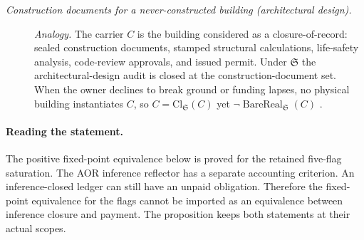 \begingroup\small
\begin{description}
\item[\emph{Construction documents for a
never-constructed building (architectural
design).}] \textit{Analogy.}
The carrier \(C\) is the building considered as a
closure-of-record: sealed construction documents,
stamped structural calculations, life-safety
analysis, code-review approvals, and issued
permit.  Under \(\mathfrak S\) the
architectural-design audit is closed at the
construction-document set.  When the owner
declines to break
ground or funding lapses, no physical building
instantiates \(C\), so \(C=\mathrm{Cl}_{\mathfrak
S}(C)\) yet \(\neg\operatorname{BareReal}
_{\mathfrak S}(C)\)
\citep{AllenIano2019Fundamentals}.

\end{description}
\endgroup


\paragraph{Reading the statement.}
The positive fixed-point equivalence below is proved for the retained
five-flag saturation. The AOR inference reflector has a separate
accounting criterion. An inference-closed ledger can still have an unpaid
obligation. Therefore the fixed-point equivalence for the flags cannot be
imported as an equivalence between inference closure and payment.
The proposition keeps both statements at their actual scopes.

